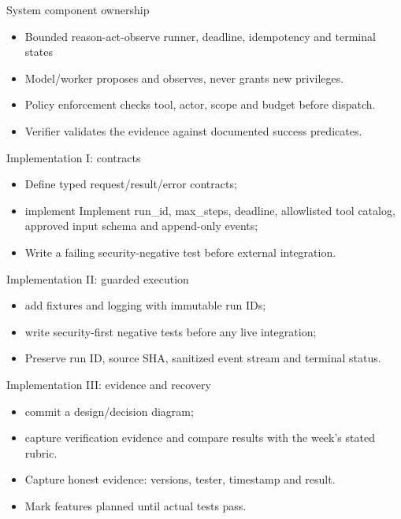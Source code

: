 \documentclass[aspectratio=169,10pt]{beamer}
\begin{document}
\begin{frame}{System component ownership}
\small
\begin{itemize}
\item Bounded reason-act-observe runner, deadline, idempotency and terminal states
\item Model/worker proposes and observes, never grants new privileges.
\item Policy enforcement checks tool, actor, scope and budget before dispatch.
\item Verifier validates the evidence against documented success predicates.
\end{itemize}

\end{frame}

\begin{frame}{Implementation I: contracts}
\small
\begin{itemize}
\item Define typed request/result/error contracts;
\item implement Implement run\_id, max\_steps, deadline, allowlisted tool catalog, approved input schema and append-only events;
\item Write a failing security-negative test before external integration.
\end{itemize}

\end{frame}

\begin{frame}{Implementation II: guarded execution}
\small
\begin{itemize}
\item add fixtures and logging with immutable run IDs;
\item write security-first negative tests before any live integration;
\item Preserve run ID, source SHA, sanitized event stream and terminal status.
\end{itemize}

\end{frame}

\begin{frame}{Implementation III: evidence and recovery}
\small
\begin{itemize}
\item commit a design/decision diagram;
\item capture verification evidence and compare results with the week's stated rubric.
\item Capture honest evidence: versions, tester, timestamp and result.
\item Mark features planned until actual tests pass.
\end{itemize}

\end{frame}
\end{document}
